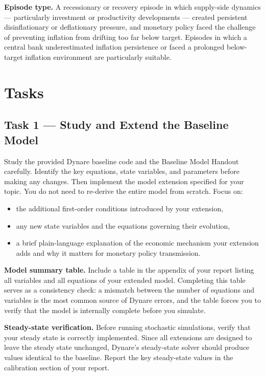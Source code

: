 \documentclass[11pt, a4paper]{article}
\begin{document}
\textbf{Episode type.} A recessionary or recovery episode in which supply-side
dynamics --- particularly investment or productivity developments --- created
persistent disinflationary or deflationary pressure, and monetary policy faced
the challenge of preventing inflation from drifting too far below target.
Episodes in which a central bank underestimated inflation persistence or faced
a prolonged below-target inflation environment are particularly suitable.

\section{Tasks}

\subsection{Task 1 --- Study and Extend the Baseline Model}

Study the provided Dynare baseline code and the Baseline Model Handout
carefully. Identify the key equations, state variables, and parameters before
making any changes. Then implement the model extension specified for your topic.
You do not need to re-derive the entire model from scratch. Focus on:

\begin{itemize}[noitemsep]
    \item the additional first-order conditions introduced by your extension,
    \item any new state variables and the equations governing their evolution,
    \item a brief plain-language explanation of the economic mechanism your
          extension adds and why it matters for monetary policy transmission.
\end{itemize}

\textbf{Model summary table.} Include a table in the appendix of your report
listing all variables and all equations of your extended model. Completing this
table serves as a consistency check: a mismatch between the number of equations
and variables is the most common source of Dynare errors, and the table forces
you to verify that the model is internally complete before you simulate.

\textbf{Steady-state verification.} Before running stochastic simulations,
verify that your steady state is correctly implemented. Since all extensions are
designed to leave the steady state unchanged, Dynare's steady-state solver
should produce values identical to the baseline. Report the key steady-state
values in the calibration section of your report.
\end{document}
